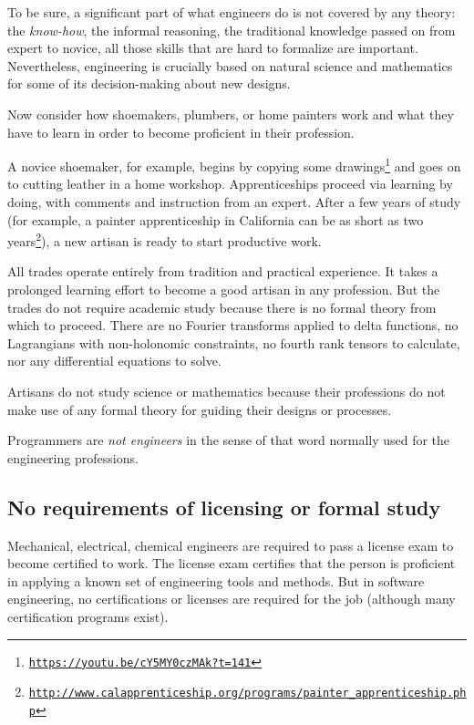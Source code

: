 To be sure, a significant part of what engineers do is not covered
by any theory: the \emph{know-how}, the informal reasoning, the traditional
knowledge passed on from expert to novice,  \textemdash{} all those
skills that are hard to formalize are important. Nevertheless, engineering
is crucially based on natural science and mathematics for some of
its decision-making about new designs.


Now consider how shoemakers, plumbers, or home painters work and what
they have to learn in order to become proficient in their profession.

A novice shoemaker, for example, begins by copying some drawings\footnote{\texttt{\href{https://youtu.be/cY5MY0czMAk?t=141}{https://youtu.be/cY5MY0czMAk?t=141}}}
and goes on to cutting leather in a home workshop. Apprenticeships
proceed via learning by doing, with comments and instruction from
an expert. After a few years of study (for example, a painter apprenticeship
in California can be as short as two years\footnote{\texttt{\href{http://www.calapprenticeship.org/programs/painter_apprenticeship.php}{http://www.calapprenticeship.org/programs/painter\_apprenticeship.php}}}),
a new artisan is ready to start productive work. 

All trades operate entirely from tradition and practical experience.
It takes a prolonged learning effort to become a good artisan in any
profession. But the trades do not require academic study because there
is no formal theory from which to proceed. There are no Fourier transforms
applied to delta functions, no Lagrangians with non-holonomic constraints,
no fourth rank tensors to calculate, nor any differential equations
to solve.

Artisans do not study science or mathematics because their professions
do not make use of any formal theory for guiding their designs or
processes.


Programmers are \emph{not engineers} in the sense of that word normally
used for the engineering professions.

\subsection*{No requirements of licensing or formal study}

Mechanical, electrical, chemical engineers are required to pass a
license exam to become certified to work. The license exam certifies
that the person is proficient in applying a known set of engineering
tools and methods. But in software engineering, no certifications
or licenses are required for the job (although many certification
programs exist).

